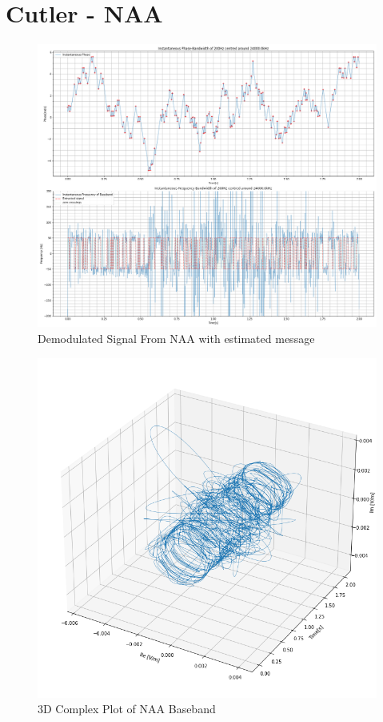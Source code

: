 \section{Cutler - NAA}
\begin{figure}[H]
    \centering
    \includegraphics[width = \textwidth]{figs/AppA/NAA.png}
    \caption{Demodulated Signal From NAA with estimated message}
    \label{fig:my_label}
\end{figure}
\begin{figure}[H]
    \centering
    \includegraphics[width = \textwidth]{figs/AppA/naa3D.png}
    \caption{3D Complex Plot of NAA Baseband}
    \label{fig:my_label}
\end{figure}